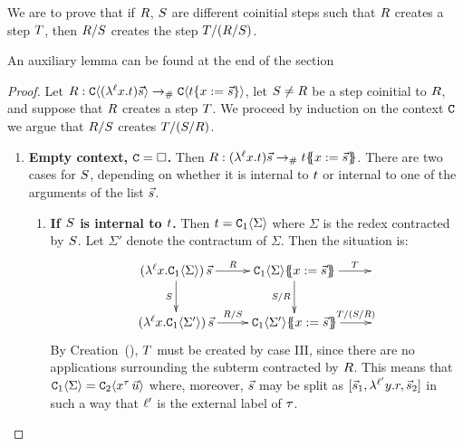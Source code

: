 
We are to prove that if $R$, $S$ are different coinitial steps such
that $R$ creates a step $T$, then $R / S$
creates the step $T / (R / S)$.

An auxiliary lemma can be found at the end of the section

\begin{proof}
Let $R : \mathtt{C}\langle(\lambda^{\ell} x. t)\vec{s}\rangle \mathrel{\to_{\mathtt{\#}}} \mathtt{C}\langle t\{x := \vec{s}\}\rangle$,
let $S \neq R$ be a step coinitial to $R$,
and suppose that $R$ creates a step $T$.
We proceed by induction on the context $\mathtt{C}$ we argue that $R/S$ creates $T/(S/R)$.

\begin{enumerate}
\item {\bf Empty context, $\mathtt{C} = \Box$.}
  Then $R : (\lambda^{\ell} x. t)\vec{s} \mathrel{\to_{\mathtt{\#}}} t\{\!\!\{x := \vec{s}\}\!\!\}$.
  There are two cases for $S$, depending on whether it is internal to $t$
  or internal to one of the arguments of the list $\vec{s}$.
  \begin{enumerate}
  \item {\bf If $S$ is internal to $t$.}
    Then $t = \mathtt{C}_1\langle\Sigma\rangle$ where $\Sigma$ is the redex contracted by $S$.
    Let $\Sigma'$ denote the contractum of $\Sigma$.
    Then the situation is:
    \[
      \xymatrix{
        (\lamp{\lab}{\var}{\con_1\of{\Sigma}})\,\ls{\tmtwo}
        \ar[r]^-{\redex}
        \ar[d]_-{\redextwo}
      &
        \con_1\of{\Sigma}\sub{\var}{\ls{\tmtwo}}
        \ar[d]_-{\redextwo/\redex}
        \ar[r]^-{\redexthree}
      &
      \\
        (\lamp{\lab}{\var}{\con_1\of{\Sigma'}})\,\ls{\tmtwo}
        \ar[r]^-{\redex/\redextwo}
      &
        \con_1\of{\Sigma'}\sub{\var}{\ls{\tmtwo}}
        \ar[r]^-{\redexthree/(\redextwo/\redex)}
      &
      }
    \]
    By Creation~(), $T$ must be created by case III,
    since there are no applications surrounding the subterm contracted by $R$.
    This means that $\mathtt{C}_1\langle\Sigma\rangle = \mathtt{C}_2\langle x^{\tau}\,\vec{u}\rangle$
    where, moreover, $\vec{s}$ may be split as $[\vec{s}_1,\lambda^{\ell'} y. r,\vec{s}_2]$
    in such a way that $\ell'$ is the external label of $\tau$.


\end{enumerate}
\end{enumerate}
\end{proof}
